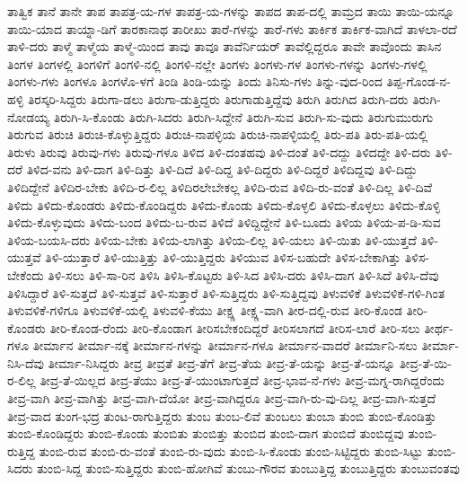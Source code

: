 {ತಾತ್ವಿಕ
ತಾನೆ
ತಾನೇ
ತಾಪ
ತಾಪತ್ರ-ಯ-ಗಳ
ತಾಪತ್ರ-ಯ-ಗಳನ್ನು
ತಾಪದ
ತಾಪ-ದಲ್ಲಿ
ತಾಮ್ರದ
ತಾಯಿ
ತಾಯಿ-ಯನ್ನೂ
ತಾಯಿ-ಯಾದ
ತಾಯ್ನಾ-ಡಿಗೆ
ತಾರಕಾನಾಥ
ತಾರೀಖು
ತಾರೆ-ಗಳನ್ನು
ತಾರೆ-ಗಳು
ತಾರ್ಕಿಕ
ತಾರ್ಕಿಕ-ವಾಗಿದೆ
ತಾಳಲಾ-ರದೆ
ತಾಳಿ-ದರು
ತಾಳ್ಮೆ
ತಾಳ್ಮೆಯ
ತಾಳ್ಮೆ-ಯಿಂದ
ತಾವು
ತಾವೂ
ತಾವೆರ್ನಿಯರ್
ತಾವೆಲ್ಲಿದ್ದರೂ
ತಾವೇ
ತಾವೊಂದು
ತಾಸಿನ
ತಿಂಗಳ
ತಿಂಗಳಲ್ಲಿ
ತಿಂಗಳಿಗೆ
ತಿಂಗಳಿ-ನಲ್ಲಿ
ತಿಂಗಳಿ-ನಲ್ಲೇ
ತಿಂಗಳು
ತಿಂಗಳು-ಗಳ
ತಿಂಗಳು-ಗಳನ್ನು
ತಿಂಗಳು-ಗಳಲ್ಲಿ
ತಿಂಗಳು-ಗಳು
ತಿಂಗಳೂ
ತಿಂಗಳೊ-ಳಗೆ
ತಿಂಡಿ
ತಿಂಡಿ-ಯನ್ನು
ತಿಂದು
ತಿನಿಸು-ಗಳು
ತಿನ್ನು-ವುದ-ರಿಂದ
ತಿಪ್ಪ-ಗೊಂಡ-ನ-ಹಳ್ಳಿ
ತಿರಸ್ಕರಿ-ಸಿದ್ದರು
ತಿರುಗಾ-ಡಲು
ತಿರುಗಾ-ಡುತ್ತಿದ್ದರು
ತಿರುಗಾಡುತ್ತಿದ್ದೆವು
ತಿರುಗಿ
ತಿರುಗಿದ
ತಿರುಗಿ-ದರು
ತಿರುಗಿ-ನೋಡಯ್ಯ
ತಿರುಗಿ-ಸಿ-ಕೊಂಡು
ತಿರುಗಿ-ಸಿದರು
ತಿರುಗಿ-ಸಿದ್ದೇನೆ
ತಿರುಗಿ-ಸುವ
ತಿರುಗಿ-ಸು-ವುದು
ತಿರುಗುಮುರುಗು
ತಿರುಗುವ
ತಿರುಚಿ
ತಿರುಚಿ-ಕೊಳ್ಳುತ್ತಿದ್ದರು
ತಿರುಚಿ-ನಾಪಳ್ಳಿಯ
ತಿರುಚಿ-ನಾಪಳ್ಳಿಯಲ್ಲಿ
ತಿರು-ಪತಿ
ತಿರು-ಪತಿ-ಯಲ್ಲಿ
ತಿರುಳು
ತಿರುವು
ತಿರುವು-ಗಳು
ತಿರುವು-ಗಳೂ
ತಿಳಿದ
ತಿಳಿ-ದಂತಹವು
ತಿಳಿ-ದಂತೆ
ತಿಳಿ-ದದ್ದು
ತಿಳಿದದ್ದೇ
ತಿಳಿ-ದರು
ತಿಳಿ-ದರೆ
ತಿಳಿದ-ವನು
ತಿಳಿ-ದಾಗ
ತಿಳಿ-ದಿತ್ತು
ತಿಳಿ-ದಿದೆ
ತಿಳಿ-ದಿದ್ದ
ತಿಳಿ-ದಿದ್ದರು
ತಿಳಿ-ದಿದ್ದರೆ
ತಿಳಿದಿದ್ದವು
ತಿಳಿ-ದಿದ್ದು
ತಿಳಿದಿದ್ದೇನೆ
ತಿಳಿದಿರ-ಬೇಕು
ತಿಳಿದಿ-ರ-ಲಿಲ್ಲ
ತಿಳಿದಿರಲೇಬೇಕಲ್ಲ
ತಿಳಿದಿ-ರುವ
ತಿಳಿದಿ-ರು-ವಂತೆ
ತಿಳಿ-ದಿಲ್ಲ
ತಿಳಿ-ದಿವೆ
ತಿಳಿದು
ತಿಳಿದು-ಕೊಂಡರು
ತಿಳಿದು-ಕೊಂಡಿದ್ದರು
ತಿಳಿದು-ಕೊಂಡು
ತಿಳಿದು-ಕೊಳ್ಳಲಿ
ತಿಳಿದು-ಕೊಳ್ಳಲು
ತಿಳಿದು-ಕೊಳ್ಳಿ
ತಿಳಿದು-ಕೊಳ್ಳುವುದು
ತಿಳಿದು-ಬಂದ
ತಿಳಿದು-ಬ-ರುವ
ತಿಳಿದೆ
ತಿಳಿದ್ದಿದ್ದೇನೆ
ತಿಳಿ-ಬೂದು
ತಿಳಿಯ
ತಿಳಿಯ-ಪ-ಡಿ-ಸುವ
ತಿಳಿಯ-ಬಯಸಿ-ದರು
ತಿಳಿಯ-ಬೇಕು
ತಿಳಿಯ-ಲಾಗಿತ್ತು
ತಿಳಿಯ-ಲಿಲ್ಲ
ತಿಳಿ-ಯಲು
ತಿಳಿ-ಯಿತು
ತಿಳಿ-ಯುತ್ತದೆ
ತಿಳಿ-ಯುತ್ತವೆ
ತಿಳಿ-ಯುತ್ತಾರೆ
ತಿಳಿ-ಯುತ್ತಿತ್ತು
ತಿಳಿ-ಯುತ್ತಿದ್ದರು
ತಿಳಿಯುವ
ತಿಳಿಸ-ಬಹುದೇ
ತಿಳಿಸ-ಬೇಕಾಗಿತ್ತು
ತಿಳಿಸ-ಬೇಕೆಂದು
ತಿಳಿ-ಸಲು
ತಿಳಿ-ಸಾ-ರಿನ
ತಿಳಿಸಿ
ತಿಳಿಸಿ-ಕೊಟ್ಟರು
ತಿಳಿ-ಸಿದ
ತಿಳಿಸಿ-ದರು
ತಿಳಿಸಿ-ದಾಗ
ತಿಳಿ-ಸಿದೆ
ತಿಳಿಸಿ-ದೆವು
ತಿಳಿಸಿದ್ದಾರೆ
ತಿಳಿ-ಸುತ್ತದೆ
ತಿಳಿ-ಸುತ್ತವೆ
ತಿಳಿ-ಸುತ್ತಾರೆ
ತಿಳಿ-ಸುತ್ತಿದ್ದರು
ತಿಳಿ-ಸುತ್ತಿದ್ದವು
ತಿಳುವಳಿಕೆ
ತಿಳುವಳಿಕೆ-ಗಳಿ-ಗಿಂತ
ತಿಳುವಳಿಕೆ-ಗಳಿಗೂ
ತಿಳುವಳಿಕೆ-ಯಲ್ಲಿ
ತಿಳುವಳಿ-ಕೆಯು
ತೀಕ್ಷ್ಣ
ತೀಕ್ಷ್ಣ-ವಾಗಿ
ತೀರ-ದಲ್ಲಿ-ರುವ
ತೀರಿ-ಕೊಂಡ
ತೀರಿ-ಕೊಂಡರು
ತೀರಿ-ಕೊಂಡ-ರೆಂದು
ತೀರಿ-ಕೊಂಡಾಗ
ತೀರಿಸಬೇಕಂದಿದ್ದರೆ
ತೀರಿಸಲಾಗದೆ
ತೀರಿಸ-ಲಾರೆ
ತೀರಿ-ಸಲು
ತೀರ್ಥ-ಗಳೂ
ತೀರ್ಮಾನ
ತೀರ್ಮಾ-ನಕ್ಕೆ
ತೀರ್ಮಾನ-ಗಳನ್ನು
ತೀರ್ಮಾನ-ಗಳೂ
ತೀರ್ಮಾನ-ವಾದರೆ
ತೀರ್ಮಾನಿ-ಸಲು
ತೀರ್ಮಾ-ನಿಸಿ-ದೆವು
ತೀರ್ಮಾ-ನಿಸಿದ್ದರು
ತೀವ್ರ
ತೀವ್ರತೆ
ತೀವ್ರ-ತೆಗೆ
ತೀವ್ರ-ತೆಯ
ತೀವ್ರ-ತೆ-ಯನ್ನು
ತೀವ್ರ-ತೆ-ಯನ್ನೂ
ತೀವ್ರ-ತೆ-ಯಿ-ರ-ಲಿಲ್ಲ
ತೀವ್ರ-ತೆ-ಯಿಲ್ಲದ
ತೀವ್ರ-ತೆಯು
ತೀವ್ರ-ತೆ-ಯುಂಟಾಗುತ್ತದೆ
ತೀವ್ರ-ಭಾವ-ನೆ-ಗಳು
ತೀವ್ರ-ಮಗ್ನ-ರಾಗಿದ್ದರೆಂದು
ತೀವ್ರ-ವಾಗಿ
ತೀವ್ರ-ವಾಗಿತ್ತು
ತೀವ್ರ-ವಾಗಿ-ದೆಯೋ
ತೀವ್ರ-ವಾಗಿದ್ದರೂ
ತೀವ್ರ-ವಾಗಿ-ರು-ವು-ದಿಲ್ಲ
ತೀವ್ರ-ವಾಗಿ-ಸುತ್ತದೆ
ತೀವ್ರ-ವಾದ
ತುಂಗ-ಭದ್ರ
ತುಂಟ-ರಾಗುತ್ತಿದ್ದರು
ತುಂಬ
ತುಂಬ-ಲಿವೆ
ತುಂಬಲು
ತುಂಬಾ
ತುಂಬಿ
ತುಂಬಿ-ಕೊಂಡಿತ್ತು
ತುಂಬಿ-ಕೊಂಡಿದ್ದರು
ತುಂಬಿ-ಕೊಂಡು
ತುಂಬಿತು
ತುಂಬಿತ್ತು
ತುಂಬಿದ
ತುಂಬಿ-ದಾಗ
ತುಂಬಿದೆ
ತುಂಬಿದ್ದವು
ತುಂಬಿ-ರುತ್ತಿದ್ದ
ತುಂಬಿ-ರುವ
ತುಂಬಿ-ರು-ವಂತೆ
ತುಂಬಿ-ರು-ವುದು
ತುಂಬಿ-ಸಿ-ಕೊಂಡು
ತುಂಬಿ-ಸಿಟ್ಟಿದ್ದರು
ತುಂಬಿ-ಸಿಟ್ಟು
ತುಂಬಿ-ಸಿದರು
ತುಂಬಿ-ಸಿದ್ದ
ತುಂಬಿ-ಸುತ್ತಿದ್ದರು
ತುಂಬಿ-ಹೋಗಿವೆ
ತುಂಬು-ಗೌರವ
ತುಂಬುತ್ತಿದ್ದ
ತುಂಬುತ್ತಿದ್ದರು
ತುಂಬುವಂತವು
}
